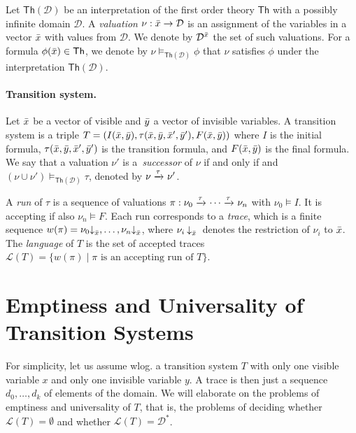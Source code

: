 \documentclass[acmsmall]{acmart}
\newcommand{\domain}{\mathcal {D}}
\newcommand{\theo}{\mathsf{Th}}
\newcommand{\thd}{\theo(\mathcal{D})}
\newcommand{\modelsthd}{\models_{\thd}}
\def\proj{\mathbin{\downarrow}}
\newcommand{\set}{\vect}
\newcommand{\arrow}[2]{\xrightarrow{{\scriptstyle #1}}_{{\scriptstyle #2}}}
\newcommand{\lang}{\mathcal {L}}
\newcommand{\Xobs}{\vect{x}}
\newcommand{\Xinv}{\vect{y}}
\newcommand{\initial}{I}
\newcommand{\accepting}{F}
\newcommand{\transition}{\tau}
\begin{document}
%
Let $\thd$ be an interpretation of the first order theory $\theo$ with a possibly infinite domain $\domain$. 
%
A \emph{valuation} $\nu : \set{x} \rightarrow \domain$ is an
assignment of the variables in a vector $\vect{x}$ with values from
$\domain$. We denote by $\domain^{\set{x}}$ the set of such
valuations. 
%
For a formula $\phi(\vect{x})\in\theo$, we denote by $\nu
\modelsthd \phi$ that $\nu$ satisfies $\phi$ under the interpretation $\thd$. 

\paragraph{Transition system.} 
%
Let $\vect{x}$ be a vector of visible and $\vect{y}$ a vector of invisible variables.
%
A transition system is a triple $T = (\initial(\Xobs,\Xinv),\transition(\Xobs,\Xinv,\Xobs', \Xinv'),\accepting(\Xobs,\Xinv))$ where $\initial$ is the initial formula, 
$\transition(\Xobs,\Xinv,\Xobs', \Xinv')$ is the transition formula, 
and $\accepting(\Xobs,\Xinv)$ is the final formula.
%
We say that a valuation $\nu'$ is 
a~\emph{successor} of $\nu$ if and only if and $(\nu\cup\nu') \modelsthd
\transition$, denoted by $\nu
\arrow{\transition}{} \nu'$. 


A \emph{run} of $\transition$ is a sequence
of valuations $\pi : \nu_0 \arrow{\transition}{}  \cdots \arrow{\transition}{} \nu_n$ with $\nu_0\models\initial$. 
It is accepting if also $\nu_n\models\accepting$.
Each run corresponds to a \emph{trace}, which is a finite sequence
$w(\pi)=\nu_0\proj_{\Xobs}, \ldots,
\nu_n\proj_{\Xobs}$, where $\nu_i\proj_{\Xobs}{}$ denotes the restriction of $\nu_i$ to $\Xobs$.
%
The \emph{language} of $T$ is the set of accepted traces 
$\lang(T) = \{w(\pi)\mid \pi \text{ is an accepting run of } T\}$.


\section{Emptiness and Universality of Transition Systems}
For simplicity, let us assume wlog. a transition system $T$ with only one visible variable $x$ and only one invisible variable $y$.
A trace is then just a sequence $d_0,\ldots, d_k$ of elements of the domain.
%
We will elaborate on the problems of emptiness and universality of $T$, that is, the problems of deciding whether $\lang(T) = \emptyset$ and  whether $\lang(T) = \domain^*$.
\end{document}
